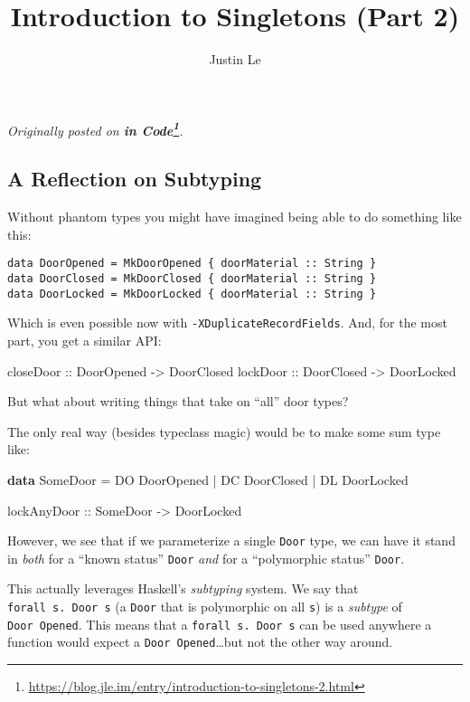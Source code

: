 \documentclass[]{article}
\title{Introduction to Singletons (Part 2)}
\author{Justin Le}
\newenvironment{Shaded}{}{}
\newcommand{\KeywordTok}[1]{\textcolor[rgb]{0.00,0.44,0.13}{\textbf{#1}}}
\newcommand{\DataTypeTok}[1]{\textcolor[rgb]{0.56,0.13,0.00}{#1}}
\newcommand{\OtherTok}[1]{\textcolor[rgb]{0.00,0.44,0.13}{#1}}
\newcommand{\FunctionTok}[1]{\textcolor[rgb]{0.02,0.16,0.49}{#1}}
\renewcommand{\href}[2]{#2\footnote{\url{#1}}}
\begin{document}
\maketitle

\emph{Originally posted on
\textbf{\href{https://blog.jle.im/entry/introduction-to-singletons-2.html}{in
Code}}.}

\subsection{A Reflection on Subtyping}\label{a-reflection-on-subtyping}

Without phantom types you might have imagined being able to do something like
this:

\begin{verbatim}
data DoorOpened = MkDoorOpened { doorMaterial :: String }
data DoorClosed = MkDoorClosed { doorMaterial :: String }
data DoorLocked = MkDoorLocked { doorMaterial :: String }
\end{verbatim}

Which is even possible now with \texttt{-XDuplicateRecordFields}. And, for the
most part, you get a similar API:

\begin{Shaded}
\begin{Highlighting}[]
\OtherTok{closeDoor ::} \DataTypeTok{DoorOpened} \OtherTok{->} \DataTypeTok{DoorClosed}
\OtherTok{lockDoor  ::} \DataTypeTok{DoorClosed} \OtherTok{->} \DataTypeTok{DoorLocked}
\end{Highlighting}
\end{Shaded}

But what about writing things that take on ``all'' door types?

The only real way (besides typeclass magic) would be to make some sum type like:

\begin{Shaded}
\begin{Highlighting}[]
\KeywordTok{data} \DataTypeTok{SomeDoor} \FunctionTok{=} \DataTypeTok{DO} \DataTypeTok{DoorOpened} \FunctionTok{|} \DataTypeTok{DC} \DataTypeTok{DoorClosed} \FunctionTok{|} \DataTypeTok{DL} \DataTypeTok{DoorLocked}

\OtherTok{lockAnyDoor ::} \DataTypeTok{SomeDoor} \OtherTok{->} \DataTypeTok{DoorLocked}
\end{Highlighting}
\end{Shaded}

However, we see that if we parameterize a single \texttt{Door} type, we can have
it stand in \emph{both} for a ``known status'' \texttt{Door} \emph{and} for a
``polymorphic status'' \texttt{Door}.

This actually leverages Haskell's \emph{subtyping} system. We say that
\texttt{forall\ s.\ Door\ s} (a \texttt{Door} that is polymorphic on all
\texttt{s}) is a \emph{subtype} of \texttt{Door\ \textquotesingle{}Opened}. This
means that a \texttt{forall\ s.\ Door\ s} can be used anywhere a function would
expect a \texttt{Door\ \textquotesingle{}Opened}\ldots{}but not the other way
around.
\end{document}
